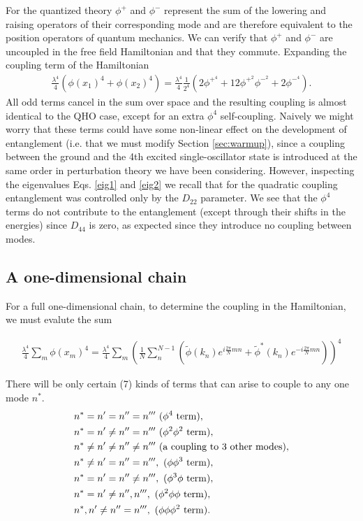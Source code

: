 \documentclass[aps,showpacs,onecolumn,floats,prd,superscriptaddress,nofootinbib]{revtex4-1}
\begin{document}
For the quantized theory $\phi^+$ and $\phi^-$ represent the sum of the lowering and raising operators of their corresponding mode and are therefore equivalent to the position operators of quantum mechanics. We can verify that $\phi^+$ and $\phi^-$ are uncoupled in the free field Hamiltonian and that they commute. Expanding the coupling term of the Hamiltonian
\begin{align}
\frac{\lambda^4}{4}\left(\phi(x_1)^4 + \phi(x_2)^4 \right)= \frac{\lambda^4}{4} \frac{1}{2^4}\left(  2 \phi^{+^{4}} + 12 \phi^{+^{2}}\phi^{-^{2}} + 2 \phi^{-^{4}}\right).
\end{align}
All odd terms cancel in the sum over space and the resulting coupling is almost identical to the QHO case, except for an extra $\phi^4$ self-coupling. Naively we might worry that these terms could have some non-linear effect on the development of entanglement (i.e. that we must modify Section \ref{sec:warmup}), since a coupling between the ground and the 4th excited single-oscillator state is introduced at the same order in perturbation theory we have been considering. However, inspecting the eigenvalues Eqs. \eqref{eig1} and \eqref{eig2} we recall that for the quadratic coupling entanglement was controlled only by the $D_{22}$ parameter. We see that the $\phi^4$ terms do not contribute to the entanglement (except through their shifts in the energies) since $D_{44}$ is zero, as expected since they introduce no coupling between modes.

\subsection{A one-dimensional chain} \label{subsec:1d}

For a full one-dimensional chain, to determine the coupling in the Hamiltonian, we must evalute the sum

\begin{align}
\frac{\lambda^4}{4}\sum_m \phi(x_m)^4 =
\frac{\lambda^4}{4} \sum_m \left( \frac{1}{N} \sum_{n}^{N - 1} (\tilde{\phi}(k_n) e^{i \frac{2\pi}{N} m n} + \tilde{\phi}^*(k_n)  e^{-i \frac{2\pi}{N} m n})\right)^4
\end{align}

There will be only certain (7) kinds of terms that can arise to couple to any one mode $n^*$.
\begin{align*}
& n^* = n' = n'' = n''' ~(\phi^4 {\rm ~term}), \\
& n^* = n' \neq n'' = n''' ~(\phi^2\phi^2 {\rm ~term}), \\
& n^* \neq n' \neq n'' \neq n''' ~(\text{a coupling to 3 other modes}), \\
& n^* \neq n' = n'' = n''', ~(\phi\phi^3 {\rm ~term}),\\
& n^* = n' = n'' \neq n''',  ~(\phi^3\phi {\rm ~term}),\\
& n^* = n' \neq n'', n''',  ~(\phi^2\phi\phi {\rm ~term}),\\
& n^*, n' \neq n'' = n''', ~(\phi\phi\phi^2 {\rm ~term}).
\end{align*}
\end{document}
